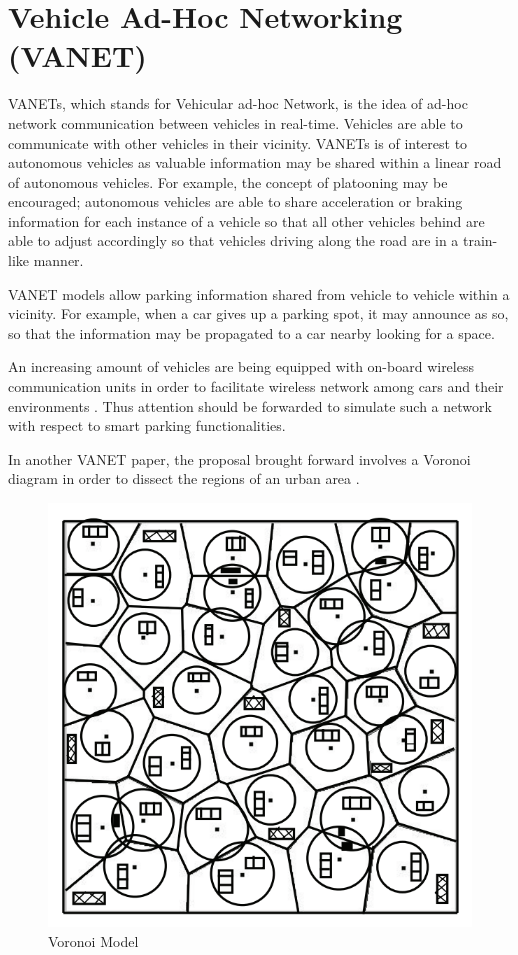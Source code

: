 \section{Vehicle Ad-Hoc Networking (VANET)}
VANETs, which stands for Vehicular ad-hoc Network, is the idea of ad-hoc network communication between vehicles in real-time. Vehicles are able to communicate with other vehicles in their vicinity. VANETs is of interest to autonomous vehicles as valuable information may be shared within a linear road of autonomous vehicles. For example, the concept of platooning may be encouraged; autonomous vehicles are able to share acceleration or braking information for each instance of a vehicle so that all other vehicles behind are able to adjust accordingly so that vehicles driving along the road are in a train-like manner.

VANET models allow parking information shared from vehicle to vehicle within a vicinity. For example, when a car gives up a parking spot, it may announce as so, so that the information may be propagated to a car nearby looking for a space.

An increasing amount of vehicles are being equipped with on-board wireless communication units in order to facilitate wireless network among cars and their environments \citep{Lin2008SecurityNetworks}. Thus attention should be forwarded to simulate such a network with respect to smart parking functionalities.

In another VANET paper, the proposal brought forward involves a Voronoi diagram in order to dissect the regions of an urban area \citep{Panayappan2007VANET-basedAvailability}.

\begin{figure}[H]
    \centering
    \includegraphics[width=0.5\linewidth]{./Images/VORONOI.png}
    \caption{Voronoi Model}
    \label{fig:sub1}
\end{figure}

